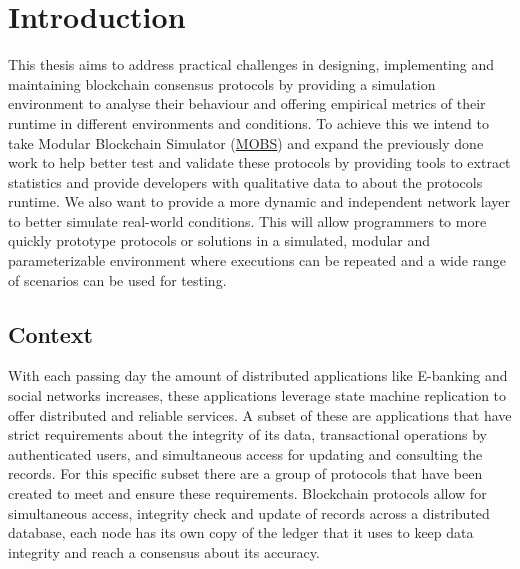 
%

\chapter{Introduction}\label{cha:introduction}

This thesis aims to address practical challenges in designing, implementing and maintaining blockchain consensus
protocols by providing a simulation environment to analyse their behaviour and offering empirical metrics of their runtime in
different environments and conditions. To achieve this we intend to take Modular Blockchain Simulator (\href{https://github.com/mce-alves/MOBS
}{MOBS}) and expand the previously done work to help better test and validate these protocols by providing tools to extract statistics and 
provide developers with qualitative data to about the protocols runtime. We also want to provide a more dynamic and independent network layer
to better simulate real-world conditions. This will allow programmers to more quickly prototype protocols or solutions
in a simulated, modular and parameterizable environment where executions can be repeated and a wide range of scenarios
can be used for testing.


\section{Context}\label{sub:context}
With each passing day the amount of distributed applications like E-banking and social networks increases, these applications
leverage state machine replication to offer distributed and reliable services. A subset of these are applications
that have strict requirements about the integrity of its data, transactional operations by authenticated users, 
and simultaneous access for updating and
consulting the records. For this specific subset there are a group of protocols that have been created to meet and ensure
these requirements. Blockchain protocols allow for simultaneous access, integrity check and update of records across
a distributed database, each node has its own copy of the ledger that it uses to keep data integrity and reach a consensus
about its accuracy.

